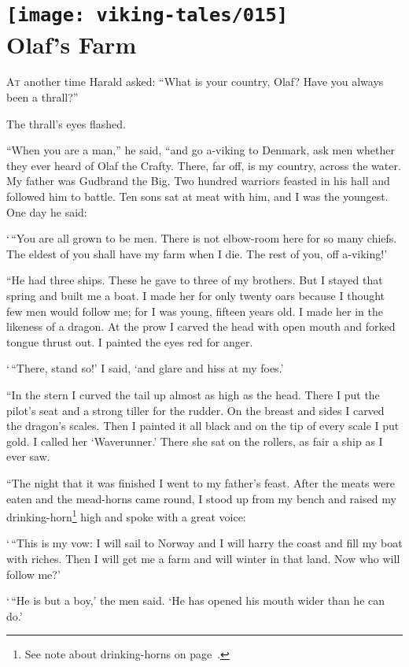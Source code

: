 \chapter[Olaf's Farm]{
    \texttt{[image: viking-tales/015]}\\
    Olaf's Farm}

\lettrine{A}{t} another time Harald asked:
\baselineskip
``What is your country, Olaf? Have you always been a thrall?''

The thrall's eyes flashed.

``When you are a man,'' he said, ``and go a-viking to Denmark, ask men
whether they ever heard of Olaf the Crafty. There, far off, is my
country, across the water. My father was Gudbrand the Big. Two hundred
warriors feasted in his hall and followed him to battle. Ten sons sat at
meat with him, and I was the youngest. One day he said:

`\,``You are all grown to be men. There is not elbow-room here for so many
chiefs. The eldest of you shall have my farm when I die. The rest of
you, off a-viking!'

``He had three ships. These he gave to three of my brothers. But I stayed
that spring and built me a boat. I made her for only twenty oars because
I thought few men would follow me; for I was young, fifteen years old. I
made her in the likeness of a dragon. At the prow I carved the head with
open mouth and forked tongue thrust out. I painted the eyes red for
anger.

`\,``There, stand so!' I said, `and glare and hiss at my foes.'

``In the stern I curved the tail up almost as high as the head. There I
put the pilot's seat and a strong tiller for the rudder. On the breast
and sides I carved the dragon's scales. Then I painted it all black and
on the tip of every scale I put gold. I called her `Waverunner.' There
she sat on the rollers, as fair a ship as I ever saw.

``The night that it was finished I went to my father's feast. After the
meats were eaten and the mead-horns came round, I stood up from my bench
and raised my drinking-horn\footnote{See note about drinking-horns on
page~\pageref{drinking-horns}.} high and spoke with a great voice:

`\,``This is my vow: I will sail to Norway and I will harry the coast and
fill my boat with riches. Then I will get me a farm and will winter in
that land. Now who will follow me?'

`\,``He is but a boy,' the men said. `He has opened his mouth wider than he
can do.'

